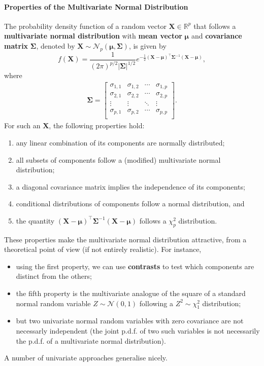 \paragraph{Properties of the Multivariate Normal Distribution}
The probability density function of a random vector $\mathbf{X}\in\mathbb{R}^p$ that follows a \textbf{multivariate normal distribution} with \textbf{mean vector} $\bm{\mu}$ and \textbf{covariance matrix} $\bm{\Sigma}$, denoted by $\bm{X}\sim\mathcal{N}_p(\bm{\mu},\bm{\Sigma})$, is given by 
\begin{equation*}
f(\bm{X})=\frac{1}{(2\pi)^{p/2}|\bm{\Sigma}|^{1/2}}e^{-\frac{1}{2}(\bm{X}-\bm{\mu})^{\!\top}\bm{\Sigma}^{-1}(\bm{X}-\bm{\mu})},
\end{equation*}
where
\begin{gather*}
    \bm{\Sigma}=
    \begin{bmatrix}
    \sigma_{1,1} & \sigma_{1,2} & \cdots & \sigma_{1,p}\\
    \sigma_{2,1} & \sigma_{2,2} & \cdots & \sigma_{2,p}\\
    \vdots & \vdots &  \ddots & \vdots\\
    \sigma_{p,1} & \sigma_{p,2} & \cdots & \sigma_{p,p}\\
    \end{bmatrix}.  
\end{gather*}
For such an $\bm{X}$, the following properties hold:
\begin{enumerate}[noitemsep]
    \item any linear combination of its components are normally distributed;
    \item all subsets of components follow a (modified) multivariate normal distribution;
    \item a diagonal covariance matrix implies the independence of its components;
    \item conditional distributions of components follow a normal distribution, and 
    \item the quantity $(\bm{X}-\bm{\mu})^{\!\top}\bm{\Sigma}^{-1}(\bm{X}-\bm{\mu})$ follows a $\chi^{2}_{p}$ distribution.
\end{enumerate}
These properties make the multivariate normal distribution attractive, from a theoretical point of view (if not entirely realistic). For instance, 
\begin{itemize}[noitemsep]
\item using the first property, we can use \textbf{contrasts} to test which components are distinct from the others; \item the fifth property is the multivariate analogue of the square of a standard normal random variable $Z\sim\mathcal{N}(0,1)$ following a $Z^2\sim \chi^2_1$ distribution;
\item but two univariate normal random variables with zero covariance are not necessarly independent (the joint p.d.f. of two such variables is not necessarily the p.d.f. of a multivariate normal distribution).
\end{itemize}
A number of univariate approaches generalise nicely. 
